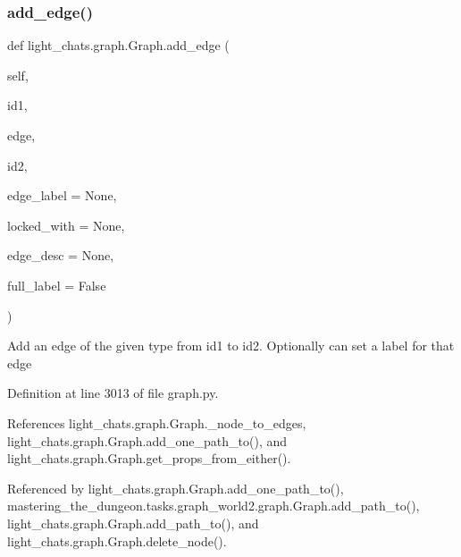 \subsubsection{\texorpdfstring{add\+\_\+edge()}{add\_edge()}}
{\footnotesize\ttfamily def light\+\_\+chats.\+graph.\+Graph.\+add\+\_\+edge (\begin{DoxyParamCaption}\item[{}]{self,  }\item[{}]{id1,  }\item[{}]{edge,  }\item[{}]{id2,  }\item[{}]{edge\+\_\+label = {\ttfamily None},  }\item[{}]{locked\+\_\+with = {\ttfamily None},  }\item[{}]{edge\+\_\+desc = {\ttfamily None},  }\item[{}]{full\+\_\+label = {\ttfamily False} }\end{DoxyParamCaption})}

\begin{DoxyVerb}Add an edge of the given type from id1 to id2. Optionally can set
a label for that edge
\end{DoxyVerb}
 

Definition at line 3013 of file graph.\+py.



References light\+\_\+chats.\+graph.\+Graph.\+\_\+node\+\_\+to\+\_\+edges, light\+\_\+chats.\+graph.\+Graph.\+add\+\_\+one\+\_\+path\+\_\+to(), and light\+\_\+chats.\+graph.\+Graph.\+get\+\_\+props\+\_\+from\+\_\+either().



Referenced by light\+\_\+chats.\+graph.\+Graph.\+add\+\_\+one\+\_\+path\+\_\+to(), mastering\+\_\+the\+\_\+dungeon.\+tasks.\+graph\+\_\+world2.\+graph.\+Graph.\+add\+\_\+path\+\_\+to(), light\+\_\+chats.\+graph.\+Graph.\+add\+\_\+path\+\_\+to(), and light\+\_\+chats.\+graph.\+Graph.\+delete\+\_\+node().

